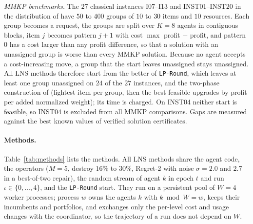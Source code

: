 \documentclass[a4paper,fleqn]{cas-sc}
\begin{document}
\textit{MMKP benchmarks.} The $27$ classical instances I07--I13 \citep{khan2002} and INST01--INST20 \citep{hifi2006} in the distribution of \citet{chen2014} have $50$ to $400$ groups of $10$ to $30$ items and $10$ resources. Each group becomes a request, the groups are split over $K = 8$ agents in contiguous blocks, item $j$ becomes pattern $j+1$ with cost $\max$ profit $-$ profit, and pattern $0$ has a cost larger than any profit difference, so that a solution with an unassigned group is worse than every MMKP solution. Because no agent accepts a cost-increasing move, a group that the start leaves unassigned stays unassigned. All LNS methods therefore start from the better of \texttt{LP-Round}, which leaves at least one group unassigned on $24$ of the $27$ instances, and the two-phase construction of \citet{khan2002} (lightest item per group, then the best feasible upgrades by profit per added normalized weight); its time is charged. On INST04 neither start is feasible, so INST04 is excluded from all MMKP comparisons. Gaps are measured against the best known values of verified solution certificates.

\paragraph{Methods.} Table~\ref{tab:methods} lists the methods. All LNS methods share the agent code, the operators ($M = 5$, destroy $16\%$ to $30\%$, Regret-2 with noise $\sigma = 2.0$ and $2.7$ in a best-of-two repair), the random stream of agent $k$ in epoch $t$ and run $\iota \in \{0,\dots,4\}$, and the \texttt{LP-Round} start. They run on a persistent pool of $W = 4$ worker processes; process $w$ owns the agents $k$ with $k \bmod W = w$, keeps their incumbents and portfolios, and exchanges only the per-level cost and usage changes with the coordinator, so the trajectory of a run does not depend on $W$.
\end{document}
